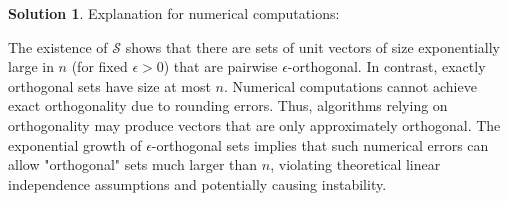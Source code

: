 \documentclass[12pt]{article}
\theoremstyle{definition}
\newtheorem*{solution}{\normalfont\textbf{Solution}}
\begin{document}
\begin{enumerate}[leftmargin=*]
\begin{solution}
        \noindent Explanation for numerical computations: 

        The existence of \(\mathcal{S}\) shows that there are sets of unit vectors of size exponentially large in \(n\) (for fixed \(\epsilon > 0\)) that are pairwise \(\epsilon\)-orthogonal. In contrast, exactly orthogonal sets have size at most \(n\). Numerical computations cannot achieve exact orthogonality due to rounding errors. Thus, algorithms relying on orthogonality may produce vectors that are only approximately orthogonal. 
        The exponential growth of \(\epsilon\)-orthogonal sets implies that such numerical errors can allow "orthogonal" sets much larger than \(n\), violating theoretical linear independence assumptions and potentially causing instability.
    \end{solution}
\end{enumerate}

\end{document}
